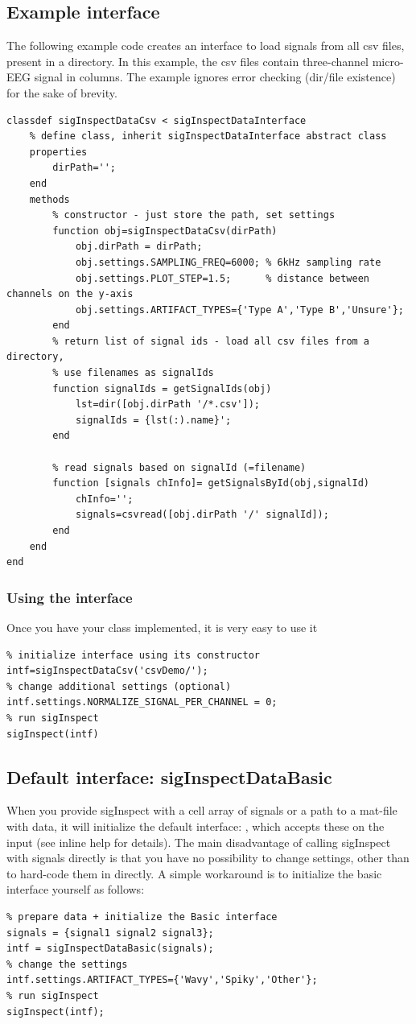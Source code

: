 \documentclass[a4paper,10pt]{article}
\begin{document}
\subsection{Example interface}
The following example code creates an interface to load signals from all csv files, present in a directory. In this example, the csv files contain three-channel micro-EEG signal in columns. The example ignores error checking (dir/file existence) for the sake of brevity.
\begin{lstlisting}
classdef sigInspectDataCsv < sigInspectDataInterface 
    % define class, inherit sigInspectDataInterface abstract class
    properties
        dirPath='';
    end
    methods
        % constructor - just store the path, set settings
        function obj=sigInspectDataCsv(dirPath)
            obj.dirPath = dirPath;
            obj.settings.SAMPLING_FREQ=6000; % 6kHz sampling rate
            obj.settings.PLOT_STEP=1.5;      % distance between channels on the y-axis
            obj.settings.ARTIFACT_TYPES={'Type A','Type B','Unsure'};            
        end        
        % return list of signal ids - load all csv files from a directory,
        % use filenames as signalIds
        function signalIds = getSignalIds(obj)
            lst=dir([obj.dirPath '/*.csv']);
            signalIds = {lst(:).name}';
        end
        
        % read signals based on signalId (=filename)
        function [signals chInfo]= getSignalsById(obj,signalId)
            chInfo='';
            signals=csvread([obj.dirPath '/' signalId]);
        end
    end
end
\end{lstlisting}
\subsubsection{Using the interface}
Once you have your class implemented, it is very easy to use it
\begin{lstlisting}
% initialize interface using its constructor
intf=sigInspectDataCsv('csvDemo/'); 
% change additional settings (optional)
intf.settings.NORMALIZE_SIGNAL_PER_CHANNEL = 0;
% run sigInspect
sigInspect(intf)
\end{lstlisting}

\subsection{Default interface: sigInspectDataBasic}
When you provide sigInspect with a cell array of signals or a path to a mat-file with data, it will initialize the default interface: , which accepts these on the input (see inline help for details). The main disadvantage of calling sigInspect with signals directly is that you have no possibility to change settings, other than to hard-code them in  directly. A simple workaround is to initialize the basic interface yourself as follows:
\begin{lstlisting}
% prepare data + initialize the Basic interface
signals = {signal1 signal2 signal3};
intf = sigInspectDataBasic(signals);
% change the settings
intf.settings.ARTIFACT_TYPES={'Wavy','Spiky','Other'};
% run sigInspect
sigInspect(intf);
\end{lstlisting}
\end{document}
